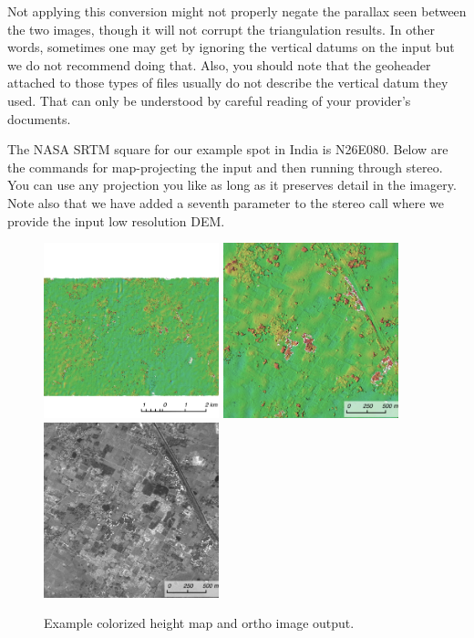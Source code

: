 Not applying this conversion might not properly negate the parallax
seen between the two images, though it will not corrupt the
triangulation results. In other words, sometimes one may get by
ignoring the vertical datums on the input but we do not recommend
doing that. Also, you should note that the geoheader attached to those
types of files usually do not describe the vertical datum they
used. That can only be understood by careful reading of your
provider's documents.

The NASA SRTM square for our example spot in India is N26E080. Below
are the commands for map-projecting the input and then running
through stereo. You can use any projection you like as long as it
preserves detail in the imagery. Note also that we have added a
seventh parameter to the stereo call where we provide the input low
resolution DEM.

\begin{figure}[h!]
\centering
  \includegraphics[width=2.0in]{images/examples/dg/MappedContext.png}
  \includegraphics[width=2.0in]{images/examples/dg/MappedCloseUp.png}
  \includegraphics[width=2.0in]{images/examples/dg/MappedCloseUpDRG.png}
\caption{Example colorized height map and ortho image output.}
\label{fig:dg-map-example}
\end{figure}


